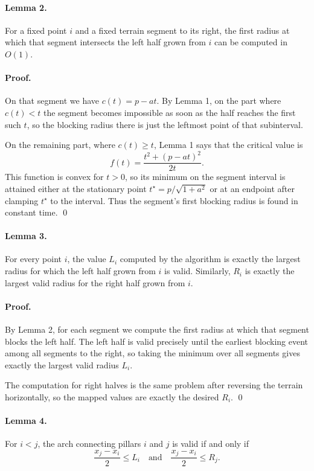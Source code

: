 \documentclass[11pt]{article}
\begin{document}
\paragraph{Lemma 2.}
For a fixed point $i$ and a fixed terrain segment to its right, the first radius at which that segment intersects the left half grown from $i$ can be computed in $O(1)$.

\paragraph{Proof.}
On that segment we have $c(t) = p - at$. By Lemma 1, on the part where $c(t) < t$ the segment becomes impossible as soon as the half reaches the first such $t$, so the blocking radius there is just the leftmost point of that subinterval.

On the remaining part, where $c(t) \ge t$, Lemma 1 says that the critical value is
\[
f(t) = \frac{t^2 + (p-at)^2}{2t}.
\]
This function is convex for $t > 0$, so its minimum on the segment interval is attained either at the stationary point $t^\star = p / \sqrt{1+a^2}$ or at an endpoint after clamping $t^\star$ to the interval. Thus the segment's first blocking radius is found in constant time. \qed

\paragraph{Lemma 3.}
For every point $i$, the value $L_i$ computed by the algorithm is exactly the largest radius for which the left half grown from $i$ is valid. Similarly, $R_i$ is exactly the largest valid radius for the right half grown from $i$.

\paragraph{Proof.}
By Lemma 2, for each segment we compute the first radius at which that segment blocks the left half. The left half is valid precisely until the earliest blocking event among all segments to the right, so taking the minimum over all segments gives exactly the largest valid radius $L_i$.

The computation for right halves is the same problem after reversing the terrain horizontally, so the mapped values are exactly the desired $R_i$. \qed

\paragraph{Lemma 4.}
For $i < j$, the arch connecting pillars $i$ and $j$ is valid if and only if
\[
\frac{x_j - x_i}{2} \le L_i
\quad\text{and}\quad
\frac{x_j - x_i}{2} \le R_j.
\]
\end{document}
